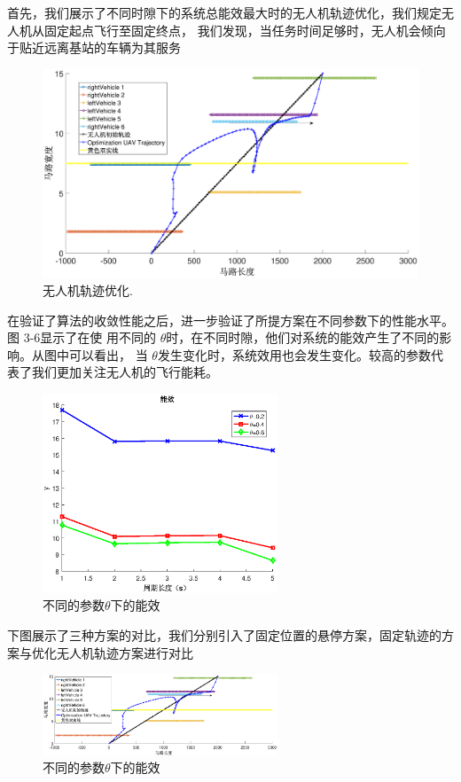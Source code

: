 首先，我们展示了不同时隙下的系统总能效最大时的无人机轨迹优化，我们规定无人机从固定起点飞行至固定终点，
我们发现，当任务时间足够时，无人机会倾向于贴近远离基站的车辆为其服务
\begin{figure}[H]
\centering
\includegraphics[width=16cm]{figures//chap4//大字体.eps}
\caption{无人机轨迹优化.}
\label{F67}
\end{figure}

在验证了算法的收敛性能之后，进一步验证了所提方案在不同参数下的性能水平。图 3-6显示了在使
用不同的 $\theta$时，在不同时隙，他们对系统的能效产生了不同的影响。从图中可以看出，
当 $\theta$发生变化时，系统效用也会发生变化。较高的参数代表了我们更加关注无人机的飞行能耗。
\begin{figure}[H]
\centering
\includegraphics[width=7cm]{figures//chap4//不同的参数theta下的能效.eps}
\caption{不同的参数$\theta$下的能效}
\label{不同的参数theta下的能效}
\end{figure}

下图展示了三种方案的对比，我们分别引入了固定位置的悬停方案，固定轨迹的方案与优化无人机轨迹方案进行对比

\begin{figure}[H]
\centering
\includegraphics[width=7cm]{figures//chap4//untitletrtrd.eps}
\caption{不同的参数$\theta$下的能效}
\label{不同的参数下的能效}
\end{figure}

